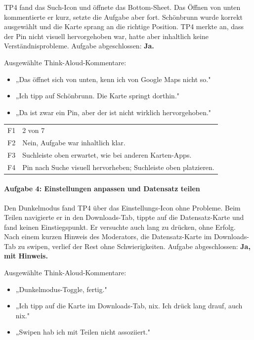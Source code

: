 \documentclass{article}
\begin{document}
TP4 fand das Such-Icon und öffnete das Bottom-Sheet.
Das Öffnen von unten kommentierte er kurz, setzte die Aufgabe aber fort.
Schönbrunn wurde korrekt ausgewählt und die Karte sprang an die richtige
Position. TP4 merkte an, dass der Pin nicht visuell hervorgehoben war,
hatte aber inhaltlich keine Verständnisprobleme.
Aufgabe abgeschlossen: \textbf{Ja.} 

Ausgewählte Think-Aloud-Kommentare:
\begin{itemize}
  \item „Das öffnet sich von unten, kenn ich von Google Maps nicht so."
  \item „Ich tipp auf Schönbrunn. Die Karte springt dorthin."
  \item „Da ist zwar ein Pin, aber der ist nicht wirklich hervorgehoben."
\end{itemize}

\begin{tabular}{@{}lp{10cm}@{}}
  F1 & 2 von 7 \\
  F2 & Nein, Aufgabe war inhaltlich klar. \\
  F3 & Suchleiste oben erwartet, wie bei anderen Karten-Apps. \\
  F4 & Pin nach Suche visuell hervorheben; Suchleiste oben platzieren. \\
\end{tabular}

\paragraph{Aufgabe 4: Einstellungen anpassen und Datensatz teilen}

Den Dunkelmodus fand TP4 über das Einstellungs-Icon ohne Probleme.
Beim Teilen navigierte er in den Downloads-Tab, tippte auf die
Datensatz-Karte und fand keinen Einstiegspunkt. Er versuchte auch
lang zu drücken, ohne Erfolg. Nach einem kurzen Hinweis des Moderators,
die Datensatz-Karte im Downloads-Tab zu swipen, verlief der Rest ohne
Schwierigkeiten.
Aufgabe abgeschlossen: \textbf{Ja, mit Hinweis.} 

Ausgewählte Think-Aloud-Kommentare:
\begin{itemize}
  \item „Dunkelmodus-Toggle, fertig."
  \item „Ich tipp auf die Karte im Downloads-Tab, nix. Ich drück lang
        drauf, auch nix."
  \item „Swipen hab ich mit Teilen nicht assoziiert."
\end{itemize}
\end{document}

